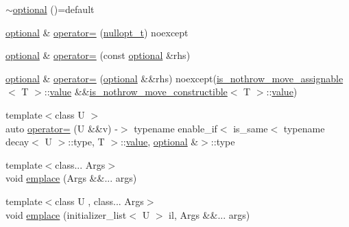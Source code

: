 \begin{DoxyCompactItemize}
\item 
\mbox{\hyperlink{classstd_1_1experimental_1_1optional_a6a0db9c777d56ec7b35fa86811d0d971}{$\sim$optional}} ()=default
\item 
\mbox{\hyperlink{classstd_1_1experimental_1_1optional}{optional}} \& \mbox{\hyperlink{classstd_1_1experimental_1_1optional_a18ebe94413663ea3b18d9e8d98fbc9af}{operator=}} (\mbox{\hyperlink{structstd_1_1experimental_1_1nullopt__t}{nullopt\+\_\+t}}) noexcept
\item 
\mbox{\hyperlink{classstd_1_1experimental_1_1optional}{optional}} \& \mbox{\hyperlink{classstd_1_1experimental_1_1optional_a79fc2baa94eb20e81898e351edbe984f}{operator=}} (const \mbox{\hyperlink{classstd_1_1experimental_1_1optional}{optional}} \&rhs)
\item 
\mbox{\hyperlink{classstd_1_1experimental_1_1optional}{optional}} \& \mbox{\hyperlink{classstd_1_1experimental_1_1optional_a458e0eb811fd30159370230cb977ab7a}{operator=}} (\mbox{\hyperlink{classstd_1_1experimental_1_1optional}{optional}} \&\&rhs) noexcept(\mbox{\hyperlink{structstd_1_1experimental_1_1is__nothrow__move__assignable}{is\+\_\+nothrow\+\_\+move\+\_\+assignable}}$<$ T $>$\+::\mbox{\hyperlink{classstd_1_1experimental_1_1optional_ad1277f09c288255dfe102b72e7107be6}{value}} \&\&\mbox{\hyperlink{structstd_1_1experimental_1_1is__nothrow__move__constructible}{is\+\_\+nothrow\+\_\+move\+\_\+constructible}}$<$ T $>$\+::\mbox{\hyperlink{classstd_1_1experimental_1_1optional_ad1277f09c288255dfe102b72e7107be6}{value}})
\item 
{\footnotesize template$<$class U $>$ }\\auto \mbox{\hyperlink{classstd_1_1experimental_1_1optional_a7234fc6703bf072bef7abd51ae6ea81f}{operator=}} (U \&\&v) -\/$>$ typename enable\+\_\+if$<$ is\+\_\+same$<$ typename decay$<$ U $>$\+::type, T $>$\+::\mbox{\hyperlink{classstd_1_1experimental_1_1optional_ad1277f09c288255dfe102b72e7107be6}{value}}, \mbox{\hyperlink{classstd_1_1experimental_1_1optional}{optional}} \&$>$\+::type
\item 
{\footnotesize template$<$class... Args$>$ }\\void \mbox{\hyperlink{classstd_1_1experimental_1_1optional_a6b60e8fad8acbead730a4eb9a8c3b80c}{emplace}} (Args \&\&... args)
\item 
{\footnotesize template$<$class U , class... Args$>$ }\\void \mbox{\hyperlink{classstd_1_1experimental_1_1optional_a1c2ef21da5656cd5c94cafbb0997736b}{emplace}} (initializer\+\_\+list$<$ U $>$ il, Args \&\&... args)

\end{DoxyCompactItemize}
